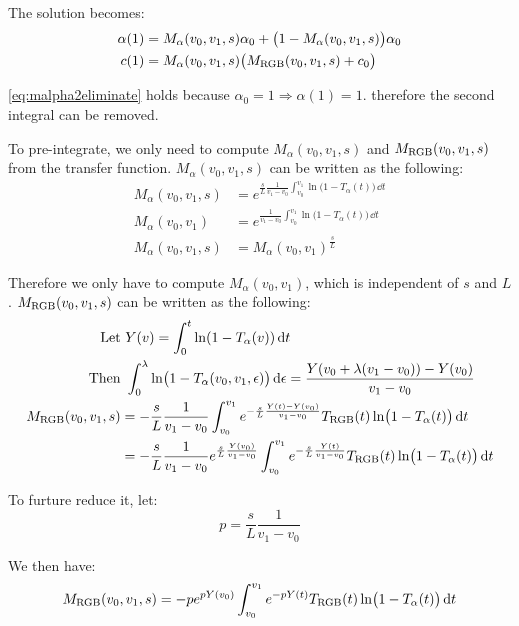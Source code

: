 \documentclass[letter, 11pt]{article}
\begin{document}
The solution becomes:
\begin{align}
\alpha(1) &= M_\alpha(v_0, v_1, s) \alpha_0 + \bigl(1 - M_\alpha(v_0, v_1, s)\bigr) \alpha_0 \label{eq:malpha2eliminate} \\
c(1) &= M_\alpha(v_0, v_1, s) \big(M_{\mathrm{RGB}}(v_0, v_1, s) + c_0\big)
\end{align}

\autoref{eq:malpha2eliminate} holds because $\alpha_0 = 1 \Rightarrow \alpha(1) = 1$. therefore the second integral can be removed.

To pre-integrate, we only need to compute $M_\alpha(v_0, v_1, s)$ and $M_{\mathrm{RGB}}(v_0, v_1, s)$ from the transfer function.
$M_\alpha(v_0, v_1, s)$ can be written as the following:
\begin{align}
M_\alpha(v_0, v_1, s) &= e^{\frac{s}{L}\frac{1}{v_1-v_0}\int_{v_0}^{v_1} \ln\bigl(1-T_\alpha(t)\bigr) \, \dd t} \\
M_\alpha(v_0, v_1) &= e^{\frac{1}{v_1-v_0}\int_{v_0}^{v_1} \ln\bigl(1-T_\alpha(t)\bigr) \, \dd t} \\
M_\alpha(v_0, v_1, s) &= M_\alpha(v_0, v_1)^{\tfrac{s}{L}}
\end{align}

Therefore we only have to compute $M_\alpha(v_0, v_1)$, which is independent of $s$ and $L$.
$M_{\mathrm{RGB}}(v_0, v_1, s)$ can be written as the following:
\begin{align}
\mathrm{Let} & \,\, Y(v) = \int_0^t\ln(1 - T_\alpha(v)) \, \mathrm{d} t \\
\mathrm{Then} & \,\, \int_0^\lambda \ln\bigl(1-T_\alpha(v_0, v_1, \epsilon)\bigr) \, \mathrm{d}\epsilon = \frac{Y(v_0 + \lambda (v_1 - v_0)) - Y(v_0)}{v_1 - v_0} \\
M_{\mathrm{RGB}}(v_0, v_1, s) &= -\frac{s}{L}\frac{1}{v_1-v_0}\int_{v_0}^{v_1} e^{-\frac{s}{L}\frac{Y(t)-Y(v_0)}{v_1 - v_0}} T_{\mathrm{RGB}}(t) \ln\bigl(1-T_\alpha(t)\bigr) \, {\mathrm{d} t} \\
  &= -\frac{s}{L}\frac{1}{v_1-v_0}e^{\frac{s}{L}\frac{Y(v_0)}{v_1 - v_0}}\int_{v_0}^{v_1} e^{-\frac{s}{L}\frac{Y(t)}{v_1 - v_0}} T_{\mathrm{RGB}}(t) \ln\bigl(1-T_\alpha(t)\bigr) \, {\mathrm{d} t} \\
\end{align}

To furture reduce it, let:
\begin{equation*}
p = \frac{s}{L}\frac{1}{v_1 - v_0}
\end{equation*}

We then have:
\begin{equation*}
M_{\mathrm{RGB}}(v_0, v_1, s) = -p e^{p Y(v_0)} \int_{v_0}^{v_1}{ e^{-p Y(t)} }T_{\mathrm{RGB}}(t) \ln\bigl(1-T_\alpha(t)\bigr) \, {\mathrm{d} t}
\end{equation*}
\end{document}

